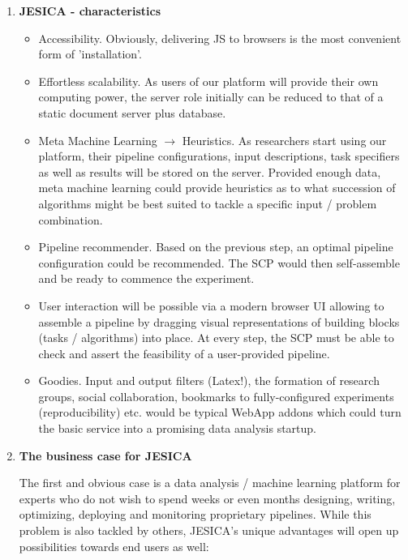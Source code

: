 \documentclass[a4paper,10pt]{article}
\begin{document}
\begin{enumerate}
\item \textbf{JESICA - characteristics}
\begin{itemize}
 \item Accessibility. Obviously, delivering JS to browsers is the most convenient form of 'installation'.
 \item Effortless scalability. As users of our platform will provide their own computing power, the server role initially can be reduced to that of a static document server plus database.
 \item Meta Machine Learning $\rightarrow$ Heuristics. As researchers start using our platform, their pipeline configurations, input descriptions, task specifiers as well as results will be stored on the server. Provided enough data, meta machine learning could provide heuristics as to what succession of algorithms might be best suited to tackle a specific input / problem combination.
 \item Pipeline recommender. Based on the previous step, an optimal pipeline configuration could be recommended. The SCP would then self-assemble and be ready to commence the experiment.
 \item User interaction will be possible via a modern browser UI allowing to assemble a pipeline by dragging visual representations of building blocks (tasks / algorithms) into place. At every step, the SCP must be able to check and assert the feasibility of a user-provided pipeline.
 \item Goodies. Input and output filters (Latex!), the formation of research groups, social collaboration, bookmarks to fully-configured experiments (reproducibility) etc. would be typical WebApp addons which could turn the basic service into a promising data analysis startup.
\end{itemize}



\item \textbf{The business case for JESICA}

The first and obvious case is a data analysis / machine learning platform for experts who do not wish to spend weeks or even months designing, writing, optimizing, deploying and monitoring proprietary pipelines. While this problem is also tackled by others, JESICA's unique advantages will open up possibilities towards end users as well:


\end{enumerate}
\end{document}

